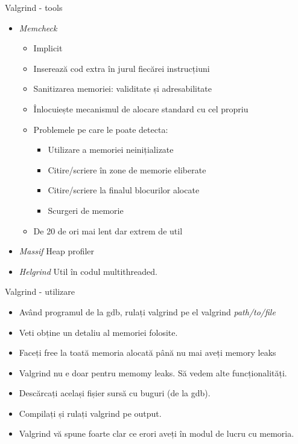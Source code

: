 \documentclass{beamer}
\begin{document}
\begin{frame}{Valgrind - tools}
\begin{itemize}
\item \textit{Memcheck}
\begin{itemize}
\item \pause Implicit
\item \pause Inserează cod extra în jurul fiecărei instrucțiuni
\item \pause Sanitizarea memoriei: \pause validitate \pause și adresabilitate
\item \pause Înlocuiește mecanismul de alocare standard cu cel propriu
\item \pause Problemele pe care le poate detecta:
\begin{itemize}
\item \pause Utilizare a memoriei neinițializate
\item \pause Citire/scriere în zone de memorie eliberate
\item \pause Citire/scriere la finalul blocurilor alocate
\item \pause Scurgeri de memorie
\end{itemize}
\item \pause De 20 de ori mai lent \pause dar extrem de util
\end{itemize}
\item \pause \textit{Massif} Heap profiler
\item \pause \textit{Helgrind} Util în codul multithreaded.
\end{itemize}
\end{frame}

\begin{frame}{Valgrind - utilizare}
\begin{itemize}
\item Având programul de la gdb, rulați valgrind pe el\linebreak
valgrind \textit{path/to/file}
\item \pause Veti obține un detaliu al memoriei folosite.
\item \pause Faceți free la toată memoria alocată până nu mai aveți memory leaks
\item \pause Valgrind nu e doar pentru memomy leaks. Să vedem alte funcționalități.
\item \pause Descărcați același fișier sursă cu buguri (de la gdb).
\item \pause Compilați și rulați valgrind pe output.
\item \pause Valgrind vă spune foarte clar ce erori aveți în modul de lucru cu memoria.
\end{itemize}
\end{frame}
\end{document}
